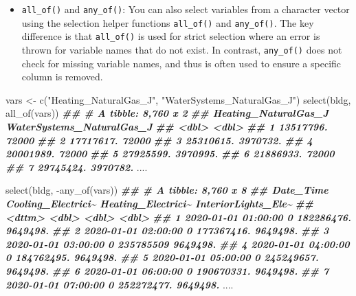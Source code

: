 \documentclass[
]{book}
\newenvironment{Shaded}{\begin{snugshade}}{\end{snugshade}}
\newcommand{\DocumentationTok}[1]{\textcolor[rgb]{0.56,0.35,0.01}{\textbf{\textit{#1}}}}
\newcommand{\FunctionTok}[1]{\textcolor[rgb]{0.00,0.00,0.00}{#1}}
\newcommand{\NormalTok}[1]{#1}
\newcommand{\OtherTok}[1]{\textcolor[rgb]{0.56,0.35,0.01}{#1}}
\newcommand{\SpecialCharTok}[1]{\textcolor[rgb]{0.00,0.00,0.00}{#1}}
\newcommand{\StringTok}[1]{\textcolor[rgb]{0.31,0.60,0.02}{#1}}
\providecommand{\tightlist}{%
  \setlength{\itemsep}{0pt}\setlength{\parskip}{0pt}}
\begin{document}
\begin{itemize}
\tightlist
\item
  \texttt{all\_of()} and \texttt{any\_of()}: You can also select variables from a character vector using the selection helper functions \texttt{all\_of()} and \texttt{any\_of()}. The key difference is that \texttt{all\_of()} is used for strict selection where an error is thrown for variable names that do not exist. In contrast, \texttt{any\_of()} does not check for missing variable names, and thus is often used to ensure a specific column is removed.
\end{itemize}

\begin{Shaded}
\begin{Highlighting}[]
\NormalTok{vars }\OtherTok{\textless{}{-}} \FunctionTok{c}\NormalTok{(}\StringTok{"Heating\_NaturalGas\_J"}\NormalTok{, }\StringTok{"WaterSystems\_NaturalGas\_J"}\NormalTok{)}
\FunctionTok{select}\NormalTok{(bldg, }\FunctionTok{all\_of}\NormalTok{(vars))}
\DocumentationTok{\#\# \# A tibble: 8,760 x 2}
\DocumentationTok{\#\#    Heating\_NaturalGas\_J WaterSystems\_NaturalGas\_J}
\DocumentationTok{\#\#                   \textless{}dbl\textgreater{}                     \textless{}dbl\textgreater{}}
\DocumentationTok{\#\#  1            13517796.                    72000 }
\DocumentationTok{\#\#  2            17717617.                    72000 }
\DocumentationTok{\#\#  3            25310615.                  3970732.}
\DocumentationTok{\#\#  4            20001989.                    72000 }
\DocumentationTok{\#\#  5            27925599.                  3970995.}
\DocumentationTok{\#\#  6            21886933.                    72000 }
\DocumentationTok{\#\#  7            29745424.                  3970782.}
\NormalTok{....}

\FunctionTok{select}\NormalTok{(bldg, }\SpecialCharTok{{-}}\FunctionTok{any\_of}\NormalTok{(vars))}
\DocumentationTok{\#\# \# A tibble: 8,760 x 8}
\DocumentationTok{\#\#    Date\_Time           Cooling\_Electrici\textasciitilde{} Heating\_Electrici\textasciitilde{} InteriorLights\_Ele\textasciitilde{}}
\DocumentationTok{\#\#    \textless{}dttm\textgreater{}                           \textless{}dbl\textgreater{}              \textless{}dbl\textgreater{}               \textless{}dbl\textgreater{}}
\DocumentationTok{\#\#  1 2020{-}01{-}01 01:00:00                  0         182286476.            9649498.}
\DocumentationTok{\#\#  2 2020{-}01{-}01 02:00:00                  0         177367416.            9649498.}
\DocumentationTok{\#\#  3 2020{-}01{-}01 03:00:00                  0         235785509             9649498.}
\DocumentationTok{\#\#  4 2020{-}01{-}01 04:00:00                  0         184762495.            9649498.}
\DocumentationTok{\#\#  5 2020{-}01{-}01 05:00:00                  0         245249657.            9649498.}
\DocumentationTok{\#\#  6 2020{-}01{-}01 06:00:00                  0         190670331.            9649498.}
\DocumentationTok{\#\#  7 2020{-}01{-}01 07:00:00                  0         252272477.            9649498.}
\NormalTok{....}
\end{Highlighting}
\end{Shaded}
\end{document}
